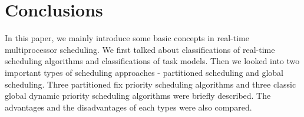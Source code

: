 \documentclass[preprint,12pt]{elsarticle}
\begin{document}

\section{Conclusions} \label{S:5}
In this paper, we mainly introduce some basic concepts in real-time multiprocessor scheduling. We first talked about classifications of real-time scheduling algorithms and classifications of task models. Then we looked into two important types of scheduling approaches - partitioned scheduling and global scheduling. Three partitioned fix priority scheduling algorithms and three classic global dynamic priority scheduling algorithms were briefly described. The advantages and the disadvantages of each types were also compared.  





\newpage








\end{document}
